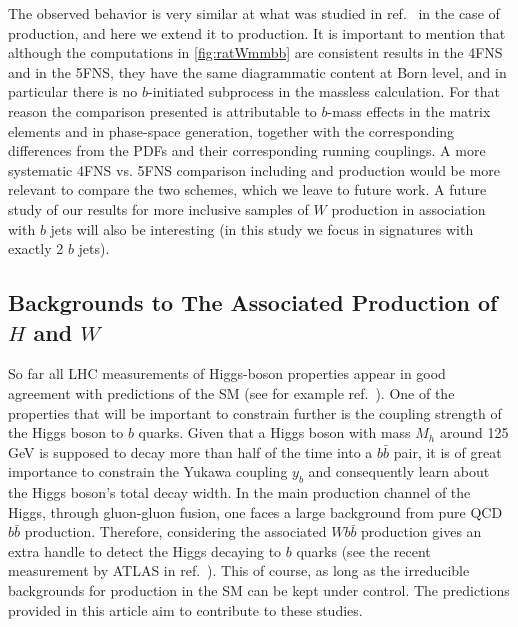 The observed behavior is very similar at what was studied in
ref.~\cite{FebresCordero:2006sj} in the case of \Wbb{} production, and here we
extend it to \Wbbj{} production. It is important to mention that although the
computations in \cref{fig:ratWmmbb} are consistent results in the 4FNS and in the
5FNS, they have the same diagrammatic content at Born level, and in
particular there is no $b$-initiated subprocess in the massless
calculation. For
that reason the comparison presented is attributable to $b$-mass effects in the
matrix elements and in phase-space generation, together with the corresponding
differences from the PDFs and their corresponding running couplings. A more
systematic 4FNS vs. 5FNS comparison including \Wbbjj{} and \Wbbjjj{}
production would be more relevant to compare the two schemes, which we leave to
future work. A future study of our results for more inclusive
samples of $W$ production in association with $b$ jets will also be
interesting (in this study we focus in signatures with exactly 2 $b$ jets).





\subsection{Backgrounds to The Associated Production of $H$ and $W$}
\label{sec:hw}

So far all LHC measurements of Higgs-boson properties appear in good agreement
with predictions of the SM 
(see for
example ref.~\cite{Khachatryan:2016vau}). One of
the properties that will be important to constrain further is the coupling strength of the Higgs
boson to $b$ quarks. Given that a Higgs boson with mass $M_h$ around 125 GeV is
supposed to decay more than half of the time into a $b\bar b$ pair, it is of great
importance to constrain the Yukawa coupling $y_b$ and consequently 
learn about the Higgs boson's total decay width.
In the main
production channel of the Higgs, through gluon-gluon fusion, one faces
a large background from pure QCD $b\bar b$ production. Therefore,
considering the associated $Wb\bar b$ production gives an extra handle to
detect the Higgs decaying to $b$ quarks (see the recent measurement by ATLAS in
ref.~\cite{ATLAS:hbb2017}). This of course, as long as the
irreducible backgrounds for \Wbb{} production in the SM can be kept under
control. The predictions provided in this article aim to contribute
to these studies.

